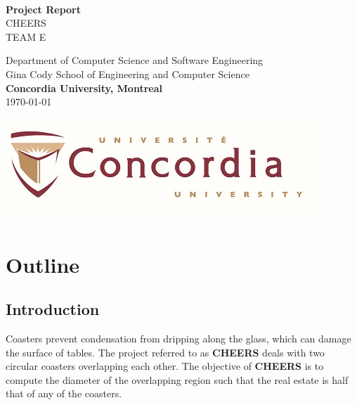\documentclass{report}
\begin{document}
\begin{titlepage}
  \begin{center}
    \textbf{\Huge\\ Project Report}
    \vspace{2cm}
    \Huge\\CHEERS\\
    \vspace{2cm}
    \Large TEAM E\\
    \begin{Large}
      
      \vspace{2 cm}
      Department of Computer Science and Software Engineering \\
      Gina Cody School of Engineering and Computer Science \\
      \textbf{Concordia University, Montreal}\\

      \vspace{1 cm}
      \today \\
    \end{Large}
  \end{center}

  \vfill
  \begin{center}
    \includegraphics[width = 50ex]{resources/concordia_med.jpg}
  \end{center}
  
\end{titlepage}

\tableofcontents{}
\printindex{}

\chapter{Outline}
\section{Introduction}
  Coasters prevent condensation from dripping along the glass, which can damage the surface of tables. The project referred to as \textbf {CHEERS} deals with two circular coasters overlapping each other. The objective of \textbf {CHEERS} is to compute the diameter of the overlapping region such that 
  the real estate is half that of any of the coasters.
\end{document}
